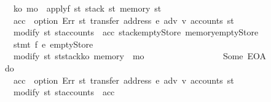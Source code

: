\begin{isabellebody}
\ \ \ \ \ \ \ \ \ \ \ \ {\isacharparenleft}{\kern0pt}k\isactrlsub o{\isacharcomma}{\kern0pt}\ m\isactrlsub o{\isacharparenright}{\kern0pt}\ {\isasymleftarrow}\ applyf\ {\isacharparenleft}{\kern0pt}{\isasymlambda}st{\isachardot}{\kern0pt}\ {\isacharparenleft}{\kern0pt}stack\ st{\isacharcomma}{\kern0pt}\ memory\ st{\isacharparenright}{\kern0pt}{\isacharparenright}{\kern0pt}{\isacharsemicolon}{\kern0pt}\isanewline
\ \ \ \ \ \ \ \ \ \ \ \ acc{\isacharprime}{\kern0pt}\ {\isasymleftarrow}\ option\ Err\ {\isacharparenleft}{\kern0pt}{\isasymlambda}st{\isachardot}{\kern0pt}\ transfer\ {\isacharparenleft}{\kern0pt}address\ e{\isacharparenright}{\kern0pt}\ adv\ v{\isacharprime}{\kern0pt}\ {\isacharparenleft}{\kern0pt}accounts\ st{\isacharparenright}{\kern0pt}{\isacharparenright}{\kern0pt}{\isacharsemicolon}{\kern0pt}\isanewline
\ \ \ \ \ \ \ \ \ \ \ \ modify\ {\isacharparenleft}{\kern0pt}{\isasymlambda}st{\isachardot}{\kern0pt}\ st{\isasymlparr}accounts\ {\isacharcolon}{\kern0pt}{\isacharequal}{\kern0pt}\ acc{\isacharprime}{\kern0pt}{\isacharcomma}{\kern0pt}\ stack{\isacharcolon}{\kern0pt}{\isacharequal}{\kern0pt}emptyStore{\isacharcomma}{\kern0pt}\ memory{\isacharcolon}{\kern0pt}{\isacharequal}{\kern0pt}emptyStore{\isasymrparr}{\isacharparenright}{\kern0pt}{\isacharsemicolon}{\kern0pt}\isanewline
\ \ \ \ \ \ \ \ \ \ \ \ stmt\ f\ e{\isacharprime}{\kern0pt}\ emptyStore{\isacharsemicolon}{\kern0pt}\isanewline
\ \ \ \ \ \ \ \ \ \ \ \ modify\ {\isacharparenleft}{\kern0pt}{\isasymlambda}st{\isachardot}{\kern0pt}\ st{\isasymlparr}stack{\isacharcolon}{\kern0pt}{\isacharequal}{\kern0pt}k\isactrlsub o{\isacharcomma}{\kern0pt}\ memory\ {\isacharcolon}{\kern0pt}{\isacharequal}{\kern0pt}\ m\isactrlsub o{\isasymrparr}{\isacharparenright}{\kern0pt}\isanewline
\ \ \ \ \ \ \ \ \ \ {\isacharbraceright}{\kern0pt}\isanewline
\ \ \ \ \ \ {\isacharbar}{\kern0pt}\ Some\ EOA\ {\isasymRightarrow}\isanewline
\ \ \ \ \ \ \ \ \ \ do\ {\isacharbraceleft}{\kern0pt}\isanewline
\ \ \ \ \ \ \ \ \ \ \ \ acc{\isacharprime}{\kern0pt}\ {\isasymleftarrow}\ option\ Err\ {\isacharparenleft}{\kern0pt}{\isasymlambda}st{\isachardot}{\kern0pt}\ transfer\ {\isacharparenleft}{\kern0pt}address\ e{\isacharparenright}{\kern0pt}\ adv\ v{\isacharprime}{\kern0pt}\ {\isacharparenleft}{\kern0pt}accounts\ st{\isacharparenright}{\kern0pt}{\isacharparenright}{\kern0pt}{\isacharsemicolon}{\kern0pt}\isanewline
\ \ \ \ \ \ \ \ \ \ \ \ modify\ {\isacharparenleft}{\kern0pt}{\isasymlambda}st{\isachardot}{\kern0pt}\ {\isacharparenleft}{\kern0pt}st{\isasymlparr}accounts\ {\isacharcolon}{\kern0pt}{\isacharequal}{\kern0pt}\ acc{\isacharprime}{\kern0pt}{\isasymrparr}{\isacharparenright}{\kern0pt}{\isacharparenright}{\kern0pt}\isanewline

\end{isabellebody}
